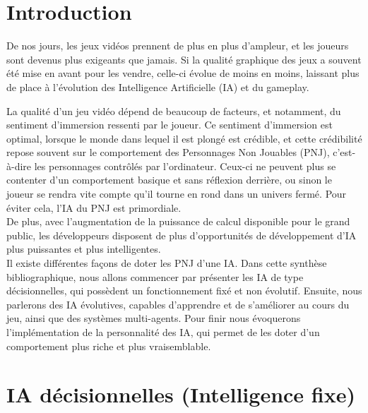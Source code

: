 \documentclass[asi]{picINSAIA}
\begin{document}
	
	\couverture{}
	
\newpage\null\thispagestyle{empty}\newpage
\tableofcontents{}

\chapter{Introduction}
De nos jours, les jeux vidéos prennent de plus en plus d'ampleur, et les joueurs sont devenus plus exigeants que jamais. 
Si la qualité graphique des jeux a souvent été mise en avant pour les vendre, celle-ci évolue de moins en moins, laissant plus de place à l'évolution des Intelligence Artificielle (IA) et du gameplay.

La qualité d'un jeu vidéo dépend de beaucoup de facteurs, et notamment, du sentiment d'immersion ressenti par le joueur. Ce sentiment d'immersion est optimal, lorsque le monde dans lequel il est plongé est crédible, et cette crédibilité repose souvent sur le comportement des Personnages Non Jouables (PNJ), c'est-à-dire les personnages contrôlés par l'ordinateur. Ceux-ci ne peuvent plus se contenter d'un comportement basique et sans réflexion derrière, ou sinon le joueur se rendra vite compte qu'il tourne en rond dans un univers fermé. Pour éviter cela, l'IA du PNJ est primordiale. \\
De plus, avec l'augmentation de la puissance de calcul disponible pour le grand public, les développeurs disposent de plus d'opportunités de développement d'IA plus puissantes et plus intelligentes.\\

Il existe différentes façons de doter les PNJ d'une IA. Dans cette synthèse bibliographique, nous allons commencer par présenter les IA de type décisionnelles, qui possèdent un fonctionnement fixé et non évolutif. Ensuite, nous parlerons des IA évolutives, capables d'apprendre et de s'améliorer au cours du jeu, ainsi que des systèmes multi-agents. Pour finir nous évoquerons l'implémentation de la personnalité des IA, qui permet de les doter d'un comportement plus riche et plus vraisemblable.


\chapter{IA décisionnelles (Intelligence fixe)}
\end{document}
